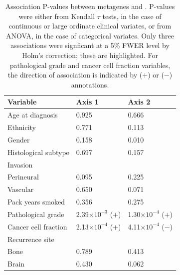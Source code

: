 \documentclass[dissertation.tex]{subfiles}
\begin{document}
\begin{table}
\centering
\caption[Association P-values between metagenes and ]{Association P-values between metagenes and .  P-values were either from Kendall $\tau$ tests, in the case of continuous or large ordinate clinical variates, or from ANOVA, in the case of categorical variates.  Only three associations were signficant at a 5\% FWER level by Holm's correction; these are highlighted.  For pathological grade and cancer cell fraction variables, the direction of association is indicated by ($+$) or ($-$) annotations.}\label{tab:sigs-mg-cpvs}
\begin{tabular}{@{}lll@{}}
Variable                   & Axis 1                        & Axis 2                        \\ \midrule
Age at diagnosis           & 0.925                         & 0.666                         \\
Ethnicity                  & 0.771                         & 0.113                         \\
Gender                     & 0.158                         & 0.010                         \\
Histological subtype       & 0.697                         & 0.157                         \\
Invasion                   &                               &                               \\
\quad Perineural           & 0.095                         & 0.225                         \\
\quad Vascular             & 0.650                         & 0.071                         \\
Pack years smoked          & 0.356                         & 0.275                         \\
Pathological grade         & 2.39$\times 10^{-3}$ ($+$)          & \cellcolor[HTML]{C0C0C0}1.30$\times 10^{-4}$ ($+$) \\
Cancer cell fraction       & \cellcolor[HTML]{C0C0C0}2.13$\times 10^{-4}$ ($+$) & \cellcolor[HTML]{C0C0C0}4.11$\times 10^{-4}$ ($-$) \\
Recurrence site            &                               &                               \\
\quad Bone                 & 0.789                         & 0.413                         \\
\quad Brain                & 0.430                         & 0.062                         \\

\end{tabular}
\end{table}
\end{document}
